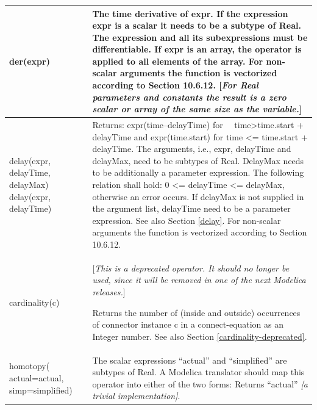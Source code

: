 \documentclass[10pt,a4paper]{report}
\begin{document}
\begin{longtable}{|p{3cm}|p{8cm}|} \hline
der(expr) & The time derivative of expr. If the expression expr is a
scalar it needs to be a subtype of Real. The expression and all its
subexpressions must be differentiable. If expr is an array, the operator
is applied to all elements of the array. For non-scalar arguments the
function is vectorized according to Section 10.6.12. {[}\emph{For Real
parameters and constants the result is a zero scalar or array of the
same size as the variable.}{]}\\ \hline
delay(expr,\linebreak \hspace*{2mm} delayTime,\linebreak \hspace*{2mm} delayMax) \linebreak delay(expr,\linebreak \hspace*{2mm} delayTime)\linebreak & Returns: expr(time--delayTime) for~~
time\textgreater{}time.start + delayTime and expr(time.start) for time
\textless{}= time.start + delayTime. The arguments, i.e., expr,
delayTime and delayMax, need to be subtypes of Real. DelayMax needs to
be additionally a parameter expression. The following relation shall
hold: 0 \textless{}= delayTime \textless{}= delayMax, otherwise an error
occurs. If delayMax is not supplied in the argument list, delayTime need
to be a parameter expression. See also Section \ref{delay}. For non-scalar
arguments the function is vectorized according to Section 10.6.12.\\ \hline
cardinality(c) & {[}\emph{This is a deprecated operator. It should no
longer be used, since it will be removed in one of the next Modelica
releases.}{]}

Returns the number of (inside and outside) occurrences of connector
instance c in a connect-equation as an Integer number. See also Section \ref{cardinality-deprecated}.\\ \hline
homotopy(\linebreak
  \hspace*{1mm} actual=actual, \linebreak
  \hspace*{1mm} simp=simplified)\linebreak & 
The scalar expressions ``actual'' and ``simplified'' are subtypes of Real. A Modelica translator should map
this operator into either of the two forms:
  Returns ``actual'' \emph{{[}a trivial implementation{]}}.


\end{longtable}
\end{document}
